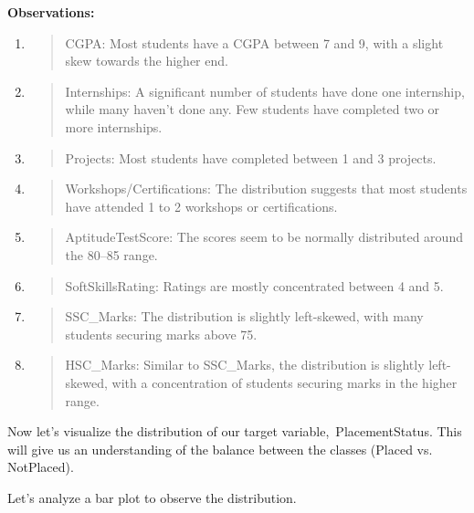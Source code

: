 \documentclass[]{article}
\begin{document}
\textbf{Observations:}

\begin{enumerate}
\def\labelenumi{\arabic{enumi}.}
\item
  \begin{quote}
  CGPA: Most students have a CGPA between 7 and 9, with a slight skew
  towards the higher end.
  \end{quote}
\item
  \begin{quote}
  Internships: A significant number of students have done one
  internship, while many haven't done any. Few students have completed
  two or more internships.
  \end{quote}
\item
  \begin{quote}
  Projects: Most students have completed between 1 and 3 projects.
  \end{quote}
\item
  \begin{quote}
  Workshops/Certifications: The distribution suggests that most students
  have attended 1 to 2 workshops or certifications.
  \end{quote}
\item
  \begin{quote}
  AptitudeTestScore: The scores seem to be normally distributed around
  the 80--85 range.
  \end{quote}
\item
  \begin{quote}
  SoftSkillsRating: Ratings are mostly concentrated between 4 and 5.
  \end{quote}
\item
  \begin{quote}
  SSC\_Marks: The distribution is slightly left-skewed, with many
  students securing marks above 75.
  \end{quote}
\item
  \begin{quote}
  HSC\_Marks: Similar to SSC\_Marks, the distribution is slightly
  left-skewed, with a concentration of students securing marks in the
  higher range.
  \end{quote}
\end{enumerate}

Now let's visualize the distribution of our target
variable,~PlacementStatus. This will give us an understanding of the
balance between the classes (Placed vs. NotPlaced).

Let's analyze a bar plot to observe the distribution.
\end{document}
